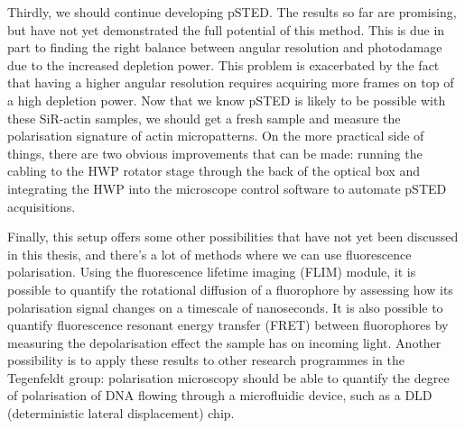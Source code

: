 Thirdly, we should continue developing pSTED. The results so far are promising, but have not yet demonstrated the full potential of this method. This is due in part to finding the right balance between angular resolution and photodamage due to the increased depletion power. This problem is exacerbated by the fact that having a higher angular resolution requires acquiring more frames on top of a high depletion power. Now that we know pSTED is likely to be possible with these SiR-actin samples, we should get a fresh sample and measure the polarisation signature of actin micropatterns. On the more practical side of things, there are two obvious improvements that can be made: running the cabling to the HWP rotator stage through the back of the optical box and integrating the HWP into the microscope control software to automate pSTED acquisitions.

Finally, this setup offers some other possibilities that have not yet been discussed in this thesis, and there's a lot of methods where we can use fluorescence polarisation. Using the fluorescence lifetime imaging (FLIM) module, it is possible to quantify the rotational diffusion of a fluorophore by assessing how its polarisation signal changes on a timescale of nanoseconds. It is also possible to quantify fluorescence resonant energy transfer (FRET) between fluorophores by measuring the depolarisation effect the sample has on incoming light. Another possibility is to apply these results to other research programmes in the Tegenfeldt group: polarisation microscopy should be able to quantify the degree of polarisation of DNA flowing through a microfluidic device, such as a DLD (deterministic lateral displacement) chip.